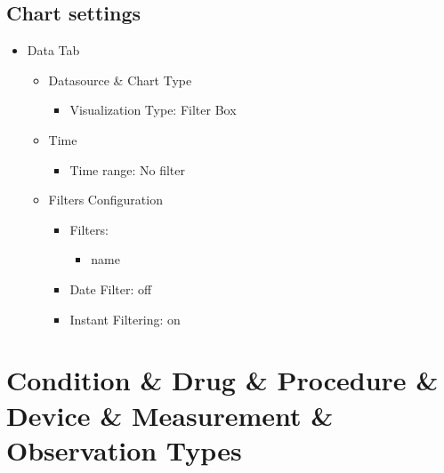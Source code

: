 \documentclass[
]{book}
\providecommand{\tightlist}{%
  \setlength{\itemsep}{0pt}\setlength{\parskip}{0pt}}
\begin{document}
\hypertarget{chart-settings-25}{%
\subsection{Chart settings}\label{chart-settings-25}}

\begin{itemize}
\tightlist
\item
  Data Tab

  \begin{itemize}
  \tightlist
  \item
    Datasource \& Chart Type

    \begin{itemize}
    \tightlist
    \item
      Visualization Type: Filter Box
    \end{itemize}
  \item
    Time

    \begin{itemize}
    \tightlist
    \item
      Time range: No filter
    \end{itemize}
  \item
    Filters Configuration

    \begin{itemize}
    \tightlist
    \item
      Filters:

      \begin{itemize}
      \tightlist
      \item
        name
      \end{itemize}
    \item
      Date Filter: off
    \item
      Instant Filtering: on
    \end{itemize}
  \end{itemize}
\end{itemize}

\hypertarget{condition-drug-procedure-device-measurement-observation-types}{%
\section{Condition \& Drug \& Procedure \& Device \& Measurement \& Observation Types}\label{condition-drug-procedure-device-measurement-observation-types}}
\end{document}
